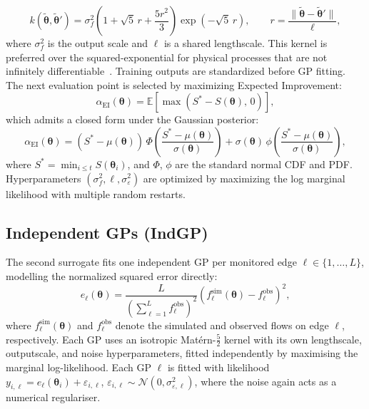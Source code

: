 \documentclass[11pt]{article}
\begin{document}
\begin{equation}
    k(\tilde{\boldsymbol{\theta}},\tilde{\boldsymbol{\theta}}')
    = \sigma^2_f
      \left(1 + \sqrt{5}\,r + \frac{5r^2}{3}\right)
      \exp\!\left(-\sqrt{5}\,r\right),
    \qquad
    r = \frac{\|\tilde{\boldsymbol{\theta}} - \tilde{\boldsymbol{\theta}}'\|}{\ell},
    \label{eq:matern52}
\end{equation}
where $\sigma^2_f$ is the output scale and $\ell$ is a shared lengthscale.
This kernel is preferred over the squared-exponential for physical processes
that are not infinitely differentiable~\parencite{snoek2012practical}.
Training outputs are standardized before GP fitting.
The next evaluation point is selected by maximizing Expected Improvement:
\begin{equation}
    \alpha_{\mathrm{EI}}(\boldsymbol{\theta})
    = \mathbb{E}\!\left[\max\!\left(S^* -
      S(\boldsymbol{\theta}),\,0\right)\right],
    \label{eq:ei}
\end{equation}
which admits a closed form under the Gaussian posterior:
\begin{equation}
    \alpha_{\mathrm{EI}}(\boldsymbol{\theta})
    = (S^* - \mu(\boldsymbol{\theta}))\,
      \Phi\!\left(\frac{S^* -
      \mu(\boldsymbol{\theta})}{\sigma(\boldsymbol{\theta})}\right)
    + \sigma(\boldsymbol{\theta})\,
      \phi\!\left(\frac{S^* -
      \mu(\boldsymbol{\theta})}{\sigma(\boldsymbol{\theta})}\right),
\end{equation}
where $S^* = \min_{i \leq t} S(\boldsymbol{\theta}_i)$,
and $\Phi$, $\phi$ are the standard normal CDF and PDF.
Hyperparameters $(\sigma^2_f, \ell, \sigma^2_\varepsilon)$ are optimized
by maximizing the log marginal likelihood with multiple random restarts.


\subsection{Independent GPs (IndGP)}
\label{subsec:indgp}

The second surrogate fits one independent GP per monitored edge
$\ell \in \{1,\dots,L\}$, modelling the normalized squared error directly:
\begin{equation}
e_\ell(\boldsymbol{\theta})
=
\frac{L}{
\left(
\sum_{\ell=1}^{L} f_\ell^{\mathrm{obs}}
\right)^2
}
\left(
f_\ell^{\mathrm{sim}}(\boldsymbol{\theta})
-
f_\ell^{\mathrm{obs}}
\right)^2,
\end{equation}
where $f_\ell^{\mathrm{sim}}(\boldsymbol{\theta})$ and
$f_\ell^{\mathrm{obs}}$ denote the simulated and observed flows on edge
$\ell$, respectively.
Each GP uses an isotropic Mat\'{e}rn-$\tfrac{5}{2}$ kernel with its own
lengthscale, outputscale, and noise hyperparameters, fitted independently
by maximising the marginal log-likelihood.
Each GP $\ell$ is fitted with likelihood
$y_{i,\ell} = e_\ell(\boldsymbol{\theta}_i) + \varepsilon_{i,\ell}$,
$\varepsilon_{i,\ell} \sim \mathcal{N}(0,\sigma^2_{\varepsilon,\ell})$,
where the noise again acts as a numerical regulariser.
\end{document}
